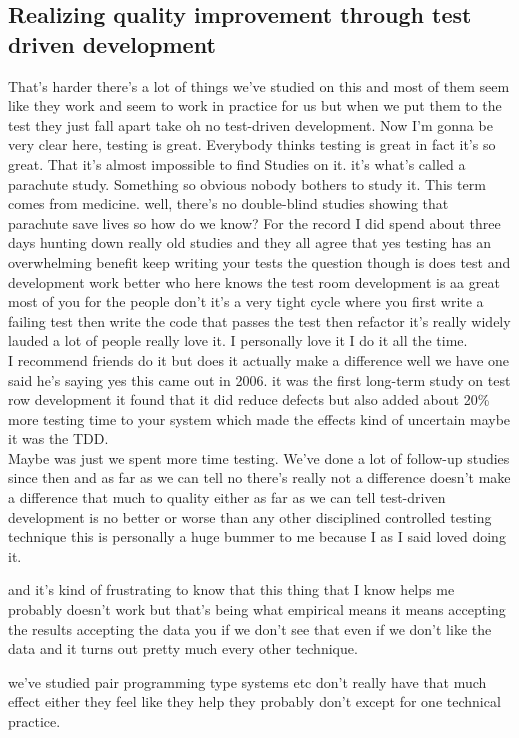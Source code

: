 \documentclass[14pt]{extreport}
\begin{document}
\subsection{Realizing quality improvement through test driven development}
That's harder there's a lot of things we've studied on this and most of them seem like they work and seem to work in practice for us but when we put them to the test they just fall apart take oh no test-driven development.
Now I'm gonna be very clear here, testing is great. 
Everybody thinks testing is great in fact it's so great.
That it's almost impossible to find Studies on it.
it's what's called a parachute study. 
Something so obvious nobody bothers to study it.
This term comes from medicine. well, there's no double-blind studies showing that parachute save lives so how do we know?  
For the record I did spend about three days hunting down really old studies and they all agree that yes testing has an overwhelming benefit keep writing your tests the question though is does test and development work better
who here knows the test room development is aa great most of you for the people don't it's a very tight cycle
where you first write a failing test then write the code that passes the test then refactor it's really widely lauded a lot of people really love it. I personally love it I do it all the time.
\\
I recommend friends do it but does it actually make a difference well we have one said he's saying yes this came out in 2006. it was the first long-term study on test row development it found that it did reduce defects but also added about 20\% more testing time to your system which made the effects kind of uncertain maybe it was the TDD.  
\\
Maybe was just we spent more time testing.
We've done a lot of follow-up studies since then and as far as we can tell no there's really not a difference doesn't make a difference that much to quality either as far as we can tell test-driven development is no better or worse than any other disciplined controlled testing technique this is personally a huge bummer to me because I as I said loved doing it. \par
and it's kind of frustrating to know that this thing that I know helps me probably doesn't work but that's being what empirical means it means accepting the results accepting the data you if we don't see that even if we don't like the data and it turns out pretty much every other technique. 
\par
we've studied pair programming type systems etc don't really have that much effect either they feel like they help they probably don't except for one technical practice. \par
\end{document}
